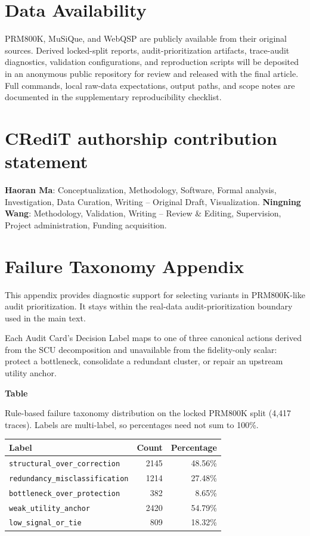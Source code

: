 \documentclass[a4paper,fleqn]{cas-sc}
\begin{document}
\section*{Data Availability}
PRM800K, MuSiQue, and WebQSP are publicly available from their original sources. Derived locked-split reports, audit-prioritization artifacts, trace-audit diagnostics, validation configurations, and reproduction scripts will be deposited in an anonymous public repository for review and released with the final article. Full commands, local raw-data expectations, output paths, and scope notes are documented in the supplementary reproducibility checklist.

\section*{CRediT authorship contribution statement}
\textbf{Haoran Ma}: Conceptualization, Methodology, Software, Formal analysis, Investigation, Data Curation, Writing -- Original Draft, Visualization. \textbf{Ningning Wang}: Methodology, Validation, Writing -- Review \& Editing, Supervision, Project administration, Funding acquisition.

\clearpage
\appendix

\section{Failure Taxonomy Appendix}
\label{app:failure-taxonomy}

This appendix provides diagnostic support for selecting variants in PRM800K-like audit prioritization. It stays within the real-data audit-prioritization boundary used in the main text.

Each Audit Card's Decision Label maps to one of three canonical actions derived from the SCU decomposition and unavailable from the fidelity-only scalar: protect a bottleneck, consolidate a redundant cluster, or repair an upstream utility anchor.

\par\medskip
{}\label{tab:failure-taxonomy}
\noindent\textbf{Table~\thetable}\par
\noindent Rule-based failure taxonomy distribution on the locked PRM800K split (4,417 traces). Labels are multi-label, so percentages need not sum to 100\%.
\begin{center}
\small
\renewcommand{\arraystretch}{1.08}
\begin{tabular}{lrr}
\toprule
\textbf{Label} & \textbf{Count} & \textbf{Percentage} \\
\midrule
\texttt{structural\_over\_correction} & 2145 & 48.56\% \\
\texttt{redundancy\_misclassification} & 1214 & 27.48\% \\
\texttt{bottleneck\_over\_protection} & 382 & 8.65\% \\
\texttt{weak\_utility\_anchor} & 2420 & 54.79\% \\
\texttt{low\_signal\_or\_tie} & 809 & 18.32\% \\
\bottomrule
\end{tabular}
\end{center}
\medskip
\end{document}
